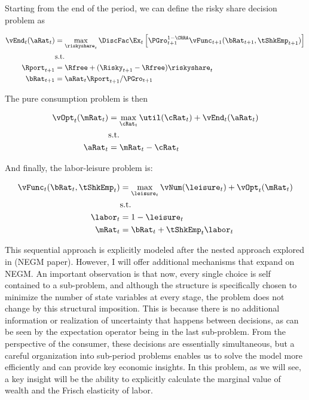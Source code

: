 \documentclass[\econtexRoot/EGMN]{subfiles}
\begin{document}
Starting from the end of the period, we can define the risky share decision problem as

\begin{equation}
    \begin{split}
        \vEnd_{t}(\aRat_{t}) & = \max_{\riskyshare_{t}} \DiscFac
        \Ex_{t} \left[ \PGro_{t+1}^{1-\CRRA}
            \vFunc_{t+1}(\bRat_{t+1},
            \tShkEmp_{t+1}) \right] \\
        & \text{s.t.} \\
        \Rport_{t+1} & = \Rfree + (\Risky_{t+1} - \Rfree)
        \riskyshare_{t} \\
        \bRat_{t+1} & = \aRat_{t} \Rport_{t+1} / \PGro_{t+1}
    \end{split}
\end{equation}

The pure consumption problem is then

\begin{equation}
    \begin{split}
        \vOpt_{t}(\mRat_{t}) & = \max_{\cRat_{t}} \util(\cRat_{t}) + \vEnd_{t}(\aRat_{t}) \\
        & \text{s.t.} \\
        \aRat_{t} & = \mRat_{t} - \cRat_{t}
    \end{split}
\end{equation}

And finally, the labor-leisure problem is:

\begin{equation}
    \begin{split}
        \vFunc_{t}(\bRat_{t}, \tShkEmp_{t}) & = \max_{ \leisure_{t}}
        \vNum(\leisure_{t}) + \vOpt_{t} (\mRat_{t}) \\
        & \text{s.t.} \\
        \labor_{t} & = 1 - \leisure_{t} \\
        \mRat_{t} & = \bRat_{t} + \tShkEmp_{t}\labor_{t} \\
    \end{split}
\end{equation}

This sequential approach is explicitly modeled after the nested approach explored in (NEGM paper). However, I will offer additional mechanisms that expand on NEGM. An important observation is that now, every single choice is self contained to a sub-problem, and although the structure is specifically chosen to minimize the number of state variables at every stage, the problem does not change by this structural imposition. This is because there is no additional information or realization of uncertainty that happens between decisions, as can be seen by the expectation operator being in the last sub-problem. From the perspective of the consumer, these decisions are essentially simultaneous, but a careful organization into sub-period problems enables us to solve the model more efficiently and can provide key economic insights. In this problem, as we will see, a key insight will be the ability to explicitly calculate the marginal value of wealth and the Frisch elasticity of labor.
\end{document}
